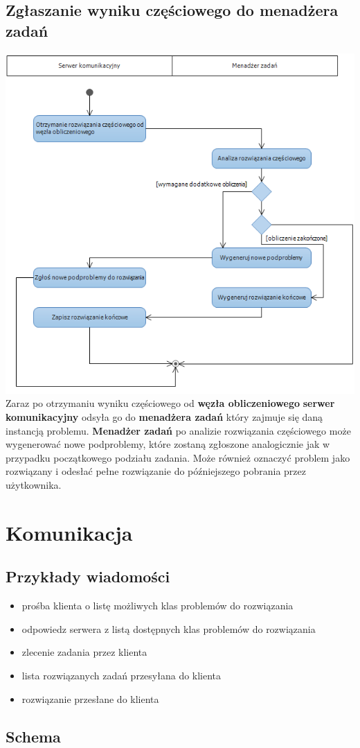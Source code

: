 \documentclass[12pt,a4paper,titlepage]{report}
\begin{document}
		\section{Zgłaszanie wyniku częściowego do menadżera zadań}
		\includegraphics[width=\textwidth]{img/diagram_cstm_submitsubtasksolution.png}
		Zaraz po otrzymaniu wyniku częściowego od \textbf{węzła obliczeniowego} \textbf{serwer komunikacyjny}
		odsyła go do \textbf{menadżera zadań} który zajmuje się daną instancją problemu. \textbf{Menadżer zadań}
		po analizie rozwiązania częściowego może wygenerować nowe podproblemy, które zostaną zgłoszone analogicznie
		jak w przypadku początkowego podziału zadania. Może również oznaczyć problem jako rozwiązany i odesłać
		pełne rozwiązanie do późniejszego pobrania przez użytkownika.

	\chapter{Komunikacja}
	\section{Przykłady wiadomości}
		\begin{itemize}
			\item prośba klienta o listę możliwych klas problemów do rozwiązania
				
			\item odpowiedz serwera z listą dostępnych klas problemów do rozwiązania
				
			\item zlecenie zadania przez klienta
				
			\item lista rozwiązanych zadań przesyłana do klienta
				
			\item rozwiązanie przesłane do klienta
				
		\end{itemize}
	\section{Schema}

		
	
	
\end{document}
